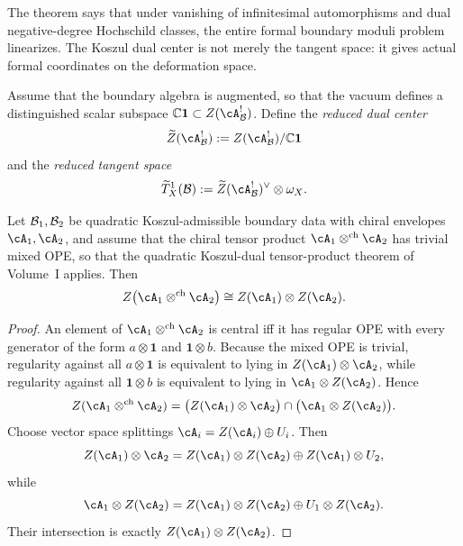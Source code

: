 \begin{remark}[Interpretation]
\label{rem:twisted-ym-central-formality-meaning}
The theorem says that under vanishing of infinitesimal automorphisms and dual negative-degree Hochschild classes, the entire formal boundary moduli problem linearizes. The Koszul dual center is not merely the tangent space: it gives actual formal coordinates on the deformation space.
\end{remark}

\begin{definition}
\label{def:twisted-ym-reduced-center}
Assume that the boundary algebra is augmented, so that the vacuum defines a distinguished scalar subspace $\mathbb{C}\mathbf{1} \subset Z(\cA_{\cB}^{!})$. Define the \emph{reduced dual center}
\[
\widetilde Z(\cA_{\cB}^{!}) := Z(\cA_{\cB}^{!})/\mathbb{C}\mathbf{1}
\]
and the \emph{reduced tangent space}
\[
\widetilde T^1_X(\cB) := \widetilde Z(\cA_{\cB}^{!})^{\vee}\otimes \omega_X.
\]
\end{definition}

\begin{lemma}
\label{lem:twisted-ym-center-tensor}
Let $\mathcal{B}_1,\mathcal{B}_2$ be quadratic Koszul-admissible boundary data with chiral envelopes $\cA_1,\cA_2$, and assume that the chiral tensor product $\cA_1\otimes^{\mathrm{ch}}\cA_2$ has trivial mixed OPE, so that the quadratic Koszul-dual tensor-product theorem of Volume~I applies. Then
\[
Z\bigl(\cA_1\otimes^{\mathrm{ch}}\cA_2\bigr)
\cong
Z(\cA_1)\otimes Z(\cA_2).
\]
\end{lemma}

\begin{proof}
An element of $\cA_1\otimes^{\mathrm{ch}}\cA_2$ is central iff it has regular OPE with every generator of the form $a\otimes \mathbf{1}$ and $\mathbf{1}\otimes b$. Because the mixed OPE is trivial, regularity against all $a\otimes \mathbf{1}$ is equivalent to lying in $Z(\cA_1)\otimes \cA_2$, while regularity against all $\mathbf{1}\otimes b$ is equivalent to lying in $\cA_1\otimes Z(\cA_2)$. Hence
\[
Z(\cA_1\otimes^{\mathrm{ch}}\cA_2)
=
\bigl(Z(\cA_1)\otimes \cA_2\bigr)
\cap
\bigl(\cA_1\otimes Z(\cA_2)\bigr).
\]
Choose vector space splittings $\cA_i = Z(\cA_i)\oplus U_i$. Then
\[
Z(\cA_1)\otimes \cA_2
=
Z(\cA_1)\otimes Z(\cA_2)
\oplus
Z(\cA_1)\otimes U_2,
\]
while
\[
\cA_1\otimes Z(\cA_2)
=
Z(\cA_1)\otimes Z(\cA_2)
\oplus
U_1\otimes Z(\cA_2).
\]
Their intersection is exactly $Z(\cA_1)\otimes Z(\cA_2)$.
\end{proof}

